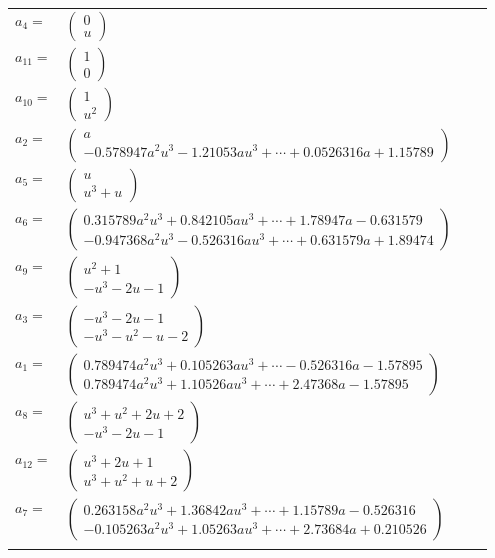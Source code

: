 \documentclass[1p]{elsarticle_modified}
\theoremstyle{definition}
\begin{document}
\begin{tabular}{m{7pt} m{180pt} m{7pt} m{180pt} }
\flushright $a_{4}=$&$\begin{pmatrix}0\\u\end{pmatrix}$ \\
\flushright $a_{11}=$&$\begin{pmatrix}1\\0\end{pmatrix}$ \\
\flushright $a_{10}=$&$\begin{pmatrix}1\\u^2\end{pmatrix}$ \\
\flushright $a_{2}=$&$\begin{pmatrix}a\\-0.578947 a^{2} u^{3}-1.21053 a u^{3}+\cdots+0.0526316 a+1.15789\end{pmatrix}$ \\
\flushright $a_{5}=$&$\begin{pmatrix}u\\u^3+u\end{pmatrix}$ \\
\flushright $a_{6}=$&$\begin{pmatrix}0.315789 a^{2} u^{3}+0.842105 a u^{3}+\cdots+1.78947 a-0.631579\\-0.947368 a^{2} u^{3}-0.526316 a u^{3}+\cdots+0.631579 a+1.89474\end{pmatrix}$ \\
\flushright $a_{9}=$&$\begin{pmatrix}u^2+1\\- u^3-2 u-1\end{pmatrix}$ \\
\flushright $a_{3}=$&$\begin{pmatrix}- u^3-2 u-1\\- u^3- u^2- u-2\end{pmatrix}$ \\
\flushright $a_{1}=$&$\begin{pmatrix}0.789474 a^{2} u^{3}+0.105263 a u^{3}+\cdots-0.526316 a-1.57895\\0.789474 a^{2} u^{3}+1.10526 a u^{3}+\cdots+2.47368 a-1.57895\end{pmatrix}$ \\
\flushright $a_{8}=$&$\begin{pmatrix}u^3+u^2+2 u+2\\- u^3-2 u-1\end{pmatrix}$ \\
\flushright $a_{12}=$&$\begin{pmatrix}u^3+2 u+1\\u^3+u^2+u+2\end{pmatrix}$ \\
\flushright $a_{7}=$&$\begin{pmatrix}0.263158 a^{2} u^{3}+1.36842 a u^{3}+\cdots+1.15789 a-0.526316\\-0.105263 a^{2} u^{3}+1.05263 a u^{3}+\cdots+2.73684 a+0.210526\end{pmatrix}$\\&\end{tabular}
\end{document}
